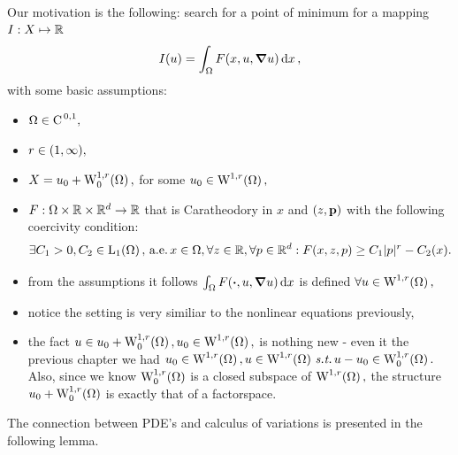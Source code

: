 \documentclass{article}
\begin{document}
Our motivation is the following: search for a point of minimum for a mapping $I:X \mapsto {\mathbb R}$ 
\[
	I(u) = \int_{\Omega}F\qty(x, u, \grad u)\dd{x},
\]
with some basic assumptions:
\begin{itemize}
	\item $\Omega \in \text{C}^{\!\,\, 0,1},$
	\item $r \in \qty(1, \infty),$
	\item $X = u_0 + \WkpzeroSet[1][r]{\Omega},$ for some $u_0 \in \WkpSet[1][r]{\Omega},$
	\item $F: \Omega \times {\mathbb R} \times {\mathbb R}^{d} \to {\mathbb R}$ that is Caratheodory in $x$ and $(z,\vb{p})$ with the following coercivity condition:
		\[
			\exists C_1 > 0, C_2 \in \LpSet[1]{\Omega}, \, \text{a.e.} \, x \in \Omega, \forall z \in \R, \forall p \in \R^d : F\qty(x,z,p)\geq C_1|p|^r - C_2(x).
		\]
\end{itemize}

\begin{remark}
	\begin{itemize}
		\item from the assumptions it follows $\int_{\Omega}F\qty(\vdot, u, \grad u)\dd{x}$ is defined $\forall u \in \WkpSet[1][r]{\Omega},$
		\item notice the setting is very similiar to the nonlinear equations previously,
		\item the fact $u \in u_0 + \WkpzeroSet[1][r]{\Omega}, u_0 \in \WkpSet[1][r]{\Omega},$ is nothing new - even it the previous chapter we had $u_0 \in \WkpSet[1][r]{\Omega}, u \in \WkpSet[1][r]{\Omega}\, \text{\textit{s.t.}} \, u-u_0 \in \WkpzeroSet[1][r]{\Omega}.$ Also, since we know $\WkpzeroSet[1][r]{\Omega}$ is a closed subspace of $\WkpSet[1][r]{\Omega},$ the structure $u_0 + \WkpzeroSet[1][r]{\Omega}$ is exactly that of a factorspace.

	\end{itemize}
\end{remark}

The connection between PDE's and calculus of variations is presented in the following lemma.
\end{document}
